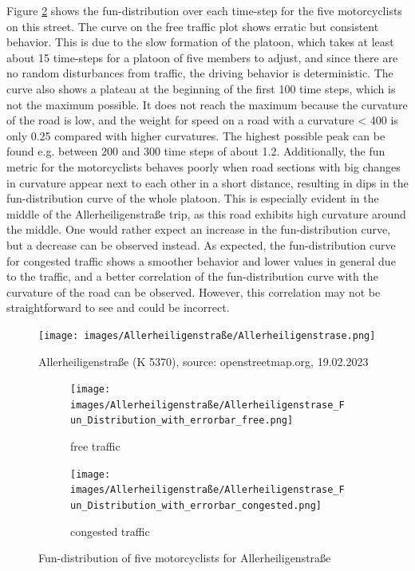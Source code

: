 Figure \ref{fig:Allerheiligenstraße_fun_distribution} shows the fun-distribution over each time-step for the five motorcyclists on this street. The curve on the free traffic plot shows erratic but consistent behavior. This is due to the slow formation of the platoon, which takes at least about 15 time-steps for a platoon of five members to adjust, and since there are no random disturbances from traffic, the driving behavior is deterministic. The curve also shows a plateau at the beginning of the first 100 time steps, which is not the maximum possible. It does not reach the maximum because the curvature of the road is low, and the weight for speed on a road with a curvature < 400 is only 0.25 compared with higher curvatures. The highest possible peak can be found e.g. between 200 and 300 time steps of about 1.2. Additionally, the fun metric for the motorcyclists behaves poorly when road sections with big changes in curvature appear next to each other in a short distance, resulting in dips in the fun-distribution curve of the whole platoon. This is especially evident in the middle of the Allerheiligenstraße trip, as this road exhibits high curvature around the middle. One would rather expect an increase in the fun-distribution curve, but a decrease can be observed instead. As expected, the fun-distribution curve for congested traffic shows a smoother behavior and lower values in general due to the traffic, and a better correlation of the fun-distribution curve with the curvature of the road can be observed. However, this correlation may not be straightforward to see and could be incorrect.\\


\begin{figure}
\centering
\texttt{[image: images/Allerheiligenstraße/Allerheiligenstrase.png]}
\caption{Allerheiligenstraße (K 5370), source: openstreetmap.org, 19.02.2023}
\label{fig:Allerheiligenstraße}
\end{figure}

\begin{figure}[h]
     \centering
     \begin{subfigure}[b]{1.0\textwidth}
         \centering
         \texttt{[image: images/Allerheiligenstraße/Allerheiligenstrase\_Fun\_Distribution\_with\_errorbar\_free.png]}
         \caption{free traffic}
     \end{subfigure}
     \hfill
     \begin{subfigure}[b]{1.0\textwidth}
         \centering
         \texttt{[image: images/Allerheiligenstraße/Allerheiligenstrase\_Fun\_Distribution\_with\_errorbar\_congested.png]}
         \caption{congested traffic}
     \end{subfigure}
        \caption{Fun-distribution of five motorcyclists for Allerheiligenstraße}
        \label{fig:Allerheiligenstraße_fun_distribution}
\end{figure}


